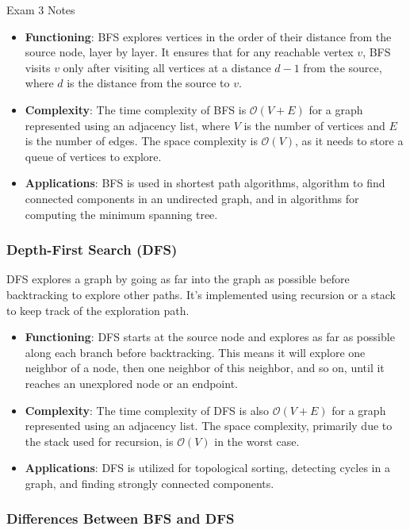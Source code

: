 \begin{examnotes}{Exam 3 Notes}
    \begin{itemize}
        \item \textbf{Functioning}: BFS explores vertices in the order of their distance from the source node, layer by layer. It ensures that for any reachable vertex $v$, BFS visits $v$ only after 
        visiting all vertices at a distance $d - 1$ from the source, where $d$ is the distance from the source to $v$.
        \item \textbf{Complexity}: The time complexity of BFS is $\mathcal{O}(V + E)$ for a graph represented using an adjacency list, where $V$ is the number of vertices and $E$ is the number of edges. 
        The space complexity is $\mathcal{O}(V)$, as it needs to store a queue of vertices to explore.
        \item \textbf{Applications}: BFS is used in shortest path algorithms, algorithm to find connected components in an undirected graph, and in algorithms for computing the minimum spanning tree.
    \end{itemize}

    \subsubsection*{Depth-First Search (DFS)}

    DFS explores a graph by going as far into the graph as possible before backtracking to explore other paths. It's implemented using recursion or a stack to keep track of the exploration path.

    \begin{itemize}
        \item \textbf{Functioning}: DFS starts at the source node and explores as far as possible along each branch before backtracking. This means it will explore one neighbor of a node, then one 
        neighbor of this neighbor, and so on, until it reaches an unexplored node or an endpoint.
        \item \textbf{Complexity}: The time complexity of DFS is also $\mathcal{O}(V + E)$ for a graph represented using an adjacency list. The space complexity, primarily due to the stack used for 
        recursion, is $\mathcal{O}(V)$ in the worst case.
        \item \textbf{Applications}: DFS is utilized for topological sorting, detecting cycles in a graph, and finding strongly connected components.
    \end{itemize}

    \subsubsection*{Differences Between BFS and DFS}


\end{examnotes}
